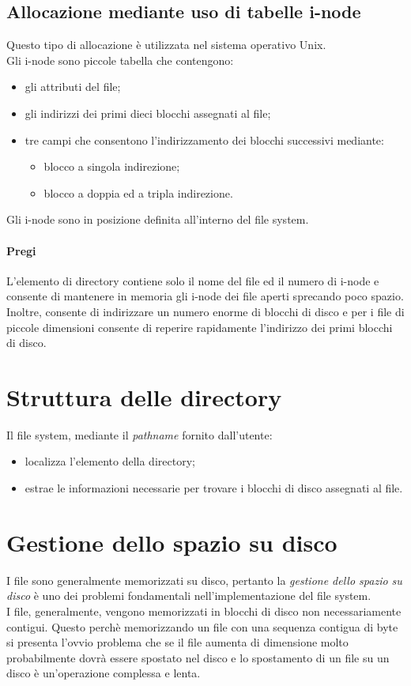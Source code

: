 \documentclass[12pt, letterpaper]{report}
\begin{document}
	\subsection{Allocazione mediante uso di tabelle i-node} Questo tipo di allocazione è utilizzata nel sistema operativo Unix. \\
	Gli i-node sono piccole tabella che contengono:
	\begin{itemize}
		\item  gli attributi del file;
		\item gli indirizzi dei primi dieci blocchi assegnati al file;
		\item tre campi che consentono l'indirizzamento dei blocchi successivi mediante:
		\begin{itemize}
			\item blocco a singola indirezione;
			\item blocco a doppia ed a tripla indirezione.
		\end{itemize}
	\end{itemize}
	Gli i-node sono in posizione definita all'interno del file system.
	\paragraph{Pregi} L'elemento di directory contiene solo il nome del file ed il numero di i-node e consente di mantenere in memoria gli i-node dei file aperti sprecando poco spazio. Inoltre, consente di indirizzare un numero enorme di blocchi di disco e per i file di piccole dimensioni consente di reperire rapidamente l'indirizzo dei primi blocchi di disco.
	\section{Struttura delle directory}
	Il file system, mediante il \textit{pathname} fornito dall'utente:
	\begin{itemize}
		\item localizza l'elemento della directory;
		\item estrae le informazioni necessarie per trovare i blocchi di disco assegnati al file.
	\end{itemize}
	\section{Gestione dello spazio su disco}
	I file sono generalmente memorizzati su disco, pertanto la \textit{gestione dello spazio su disco} è uno dei problemi fondamentali nell'implementazione del file system. \\
	I file, generalmente, vengono memorizzati in blocchi di disco non necessariamente contigui. Questo perchè memorizzando un file con una sequenza contigua di byte si presenta l'ovvio problema che se il file aumenta di dimensione molto probabilmente dovrà essere spostato nel disco e lo spostamento di un file su un disco è un'operazione complessa e lenta.
\end{document}
